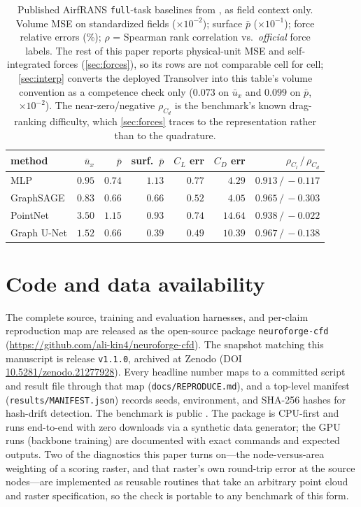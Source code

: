 \begin{table}[t]
\centering\small
\caption{Published AirfRANS \texttt{full}-task baselines from \citet{bonnet2022airfrans}, as
field context only. Volume MSE on standardized fields ($\times10^{-2}$); surface $\bar p$
($\times10^{-1}$); force relative errors (\%); $\rho$ = Spearman rank correlation vs.\
\emph{official} force labels. The rest of this paper reports physical-unit MSE and
self-integrated forces (\autoref{sec:forces}), so its rows are not comparable cell for
cell; \autoref{sec:interp} converts the deployed Transolver into this table's volume
convention as a competence check only ($0.073$ on $\bar u_x$ and $0.099$ on $\bar p$,
$\times10^{-2}$). The near-zero/negative $\rho_{C_d}$ is the
benchmark's known drag-ranking difficulty, which \autoref{sec:forces} traces to the
representation rather than to the quadrature.}
\label{tab:airfrans-sota}
\begin{tabular}{l r r r r r r}
\toprule
method & $\bar u_x$ & $\bar p$ & surf.\ $\bar p$ & $C_L$ err & $C_D$ err & $\rho_{C_l}\,/\,\rho_{C_d}$ \\
\midrule
MLP         & $0.95$ & $0.74$ & $1.13$ & $0.77$  & $4.29$  & $0.913\,/\,{-}0.117$ \\
GraphSAGE   & $0.83$ & $0.66$ & $0.66$ & $0.52$  & $4.05$  & $0.965\,/\,{-}0.303$ \\
PointNet    & $3.50$ & $1.15$ & $0.93$ & $0.74$  & $14.64$ & $0.938\,/\,{-}0.022$ \\
Graph U-Net & $1.52$ & $0.66$ & $0.39$ & $0.49$  & $10.39$ & $0.967\,/\,{-}0.138$ \\
\bottomrule
\end{tabular}
\end{table}

\section*{Code and data availability}
The complete source, training and evaluation harnesses, and per-claim reproduction map
are released as the open-source package \texttt{neuroforge-cfd}
(\url{https://github.com/ali-kin4/neuroforge-cfd}). The snapshot matching this manuscript is
release \texttt{v1.1.0}, archived at Zenodo \citep{jabbary2026neuroforgecfd} (DOI
\href{https://doi.org/10.5281/zenodo.21277928}{10.5281/zenodo.21277928}). Every headline
number maps to a committed script and result file through that map
(\texttt{docs\slash{}REPRODUCE.md}), and a top-level
manifest (\texttt{results\slash{}MANIFEST.json}) records seeds, environment, and SHA-256 hashes for
hash-drift detection. The benchmark is public \citep{bonnet2022airfrans}. The package is
CPU-first and runs end-to-end with zero downloads via a synthetic data generator; the GPU
runs (backbone training) are documented with exact commands and expected outputs. Two of
the diagnostics this paper turns on---the node-versus-area weighting of a scoring raster, and
that raster's own round-trip error at the source nodes---are implemented as reusable
routines that take an arbitrary point cloud and raster specification, so the check is
portable to any benchmark of this form.

